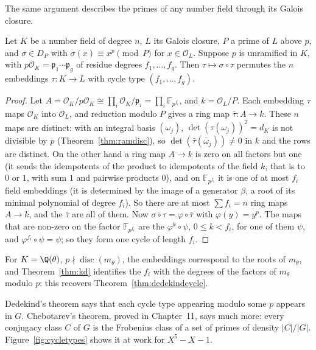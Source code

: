 The same argument describes the primes of any number field through its Galois closure.

\begin{proposition}\label{prop:frobembed}
Let $K$ be a number field of degree $n$, $L$ its Galois closure, $P$ a prime of $L$ above $p$, and $\sigma\in D_P$ with
$\sigma(x)\equiv x^p\pmod P$ for $x\in\mathcal O_L$. Suppose $p$ is unramified in $K$, with $p\mathcal O_K=\mathfrak p_1
\cdots\mathfrak p_g$ of residue degrees $f_1,\dots,f_g$. Then $\tau\mapsto\sigma\circ\tau$ permutes the $n$ embeddings
$\tau:K\to L$ with cycle type $(f_1,\dots,f_g)$.
\end{proposition}
\begin{proof}
Let $A=\mathcal O_K/p\mathcal O_K\cong\prod_i\mathcal O_K/\mathfrak p_i=\prod_i\mathbb F_{p^{f_i}}$, and $k=\mathcal O_L/P$.
Each embedding $\tau$ maps $\mathcal O_K$ into $\mathcal O_L$, and reduction modulo $P$ gives a ring map $\bar\tau:A\to
k$. These $n$ maps are distinct: with an integral basis $(\omega_j)$, $\det(\tau(\omega_j))^2=d_K$ is not divisible by
$p$ (Theorem~\ref{thm:ramdisc}), so $\det(\bar\tau(\bar\omega_j))\ne0$ in $k$ and the rows are distinct. On the other
hand a ring map $A\to k$ is zero on all factors but one (it sends the idempotents of the product to idempotents of
the field $k$, that is to $0$ or $1$, with sum $1$ and pairwise products $0$), and on $\mathbb F_{p^{f_i}}$ it is one of at most $f_i$ field
embeddings (it is determined by the image of a generator $\beta$, a root of its minimal polynomial of degree $f_i$). So
there are at most $\sum f_i=n$ ring maps $A\to k$, and the $\bar\tau$ are all of them. Now $\overline{\sigma\circ\tau}=
\varphi\circ\bar\tau$ with $\varphi(y)=y^p$. The maps that are non-zero on the factor $\mathbb F_{p^{f_i}}$ are the
$\varphi^k\circ\psi$, $0\le k<f_i$, for one of them $\psi$, and $\varphi^{f_i}\circ\psi=\psi$; so they form one cycle of
length $f_i$.
\end{proof}

For $K=\Q(\theta)$, $p\nmid\operatorname{disc}(m_\theta)$, the embeddings correspond to the roots of $m_\theta$, and
Theorem~\ref{thm:kd} identifies the $f_i$ with the degrees of the factors of $m_\theta$ modulo $p$: this recovers
Theorem~\ref{thm:dedekindcycle}.

Dedekind's theorem says that each cycle type appearing modulo some $p$ appears in $G$. Chebotarev's theorem, proved in
Chapter~11, says much more: every conjugacy class $C$ of $G$ is the Frobenius class of a set of primes of density
$|C|/|G|$. Figure~\ref{fig:cycletypes} shows it at work for $X^5-X-1$.


